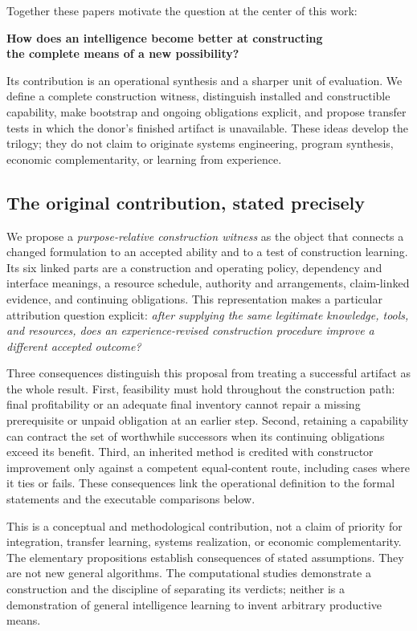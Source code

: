 Together these papers motivate the question at the center of this work:
\begin{center}
\large\color{Plum}\textbf{How does an intelligence become better at constructing\\the complete means of a new possibility?}
\end{center}
Its contribution is an operational synthesis and a sharper unit of evaluation. We define a complete construction witness, distinguish installed and constructible capability, make bootstrap and ongoing obligations explicit, and propose transfer tests in which the donor's finished artifact is unavailable. These ideas develop the trilogy; they do not claim to originate systems engineering, program synthesis, economic complementarity, or learning from experience.

\subsection{The original contribution, stated precisely}

We propose a \emph{purpose-relative construction witness} as the object that connects a changed formulation to an accepted ability and to a test of construction learning. Its six linked parts are a construction and operating policy, dependency and interface meanings, a resource schedule, authority and arrangements, claim-linked evidence, and continuing obligations. This representation makes a particular attribution question explicit: \emph{after supplying the same legitimate knowledge, tools, and resources, does an experience-revised construction procedure improve a different accepted outcome?}

Three consequences distinguish this proposal from treating a successful artifact as the whole result. First, feasibility must hold throughout the construction path: final profitability or an adequate final inventory cannot repair a missing prerequisite or unpaid obligation at an earlier step. Second, retaining a capability can contract the set of worthwhile successors when its continuing obligations exceed its benefit. Third, an inherited method is credited with constructor improvement only against a competent equal-content route, including cases where it ties or fails. These consequences link the operational definition to the formal statements and the executable comparisons below.

This is a conceptual and methodological contribution, not a claim of priority for integration, transfer learning, systems realization, or economic complementarity. The elementary propositions establish consequences of stated assumptions. They are not new general algorithms. The computational studies demonstrate a construction and the discipline of separating its verdicts; neither is a demonstration of general intelligence learning to invent arbitrary productive means.

